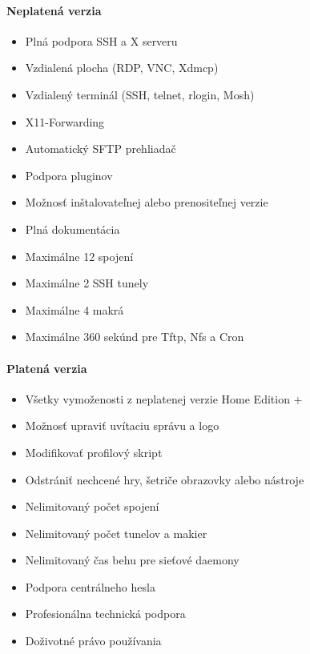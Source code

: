 \paragraph{Neplatená verzia}
\begin{itemize}
	\item Plná podpora SSH a X serveru
	\item Vzdialená plocha (RDP, VNC, Xdmcp)
	\item Vzdialený terminál (SSH, telnet, rlogin, Mosh)
	\item X11-Forwarding
	\item Automatický SFTP prehliadač
	\item Podpora pluginov
	\item Možnosť inštalovateľnej alebo prenositeľnej verzie
	\item Plná dokumentácia
	\item Maximálne 12 spojení
	\item Maximálne 2 SSH tunely
	\item Maximálne 4 makrá
	\item Maximálne 360 sekúnd pre Tftp, Nfs a Cron
\end{itemize}

\paragraph{Platená verzia}

\begin{itemize}
	\item Všetky vymoženosti z neplatenej verzie Home Edition +
	\item Možnosť upraviť uvítaciu správu a logo
	\item Modifikovať profilový skript
	\item Odstrániť nechcené hry, šetriče obrazovky alebo nástroje
	\item Nelimitovaný počet spojení
	\item Nelimitovaný počet tunelov a makier
	\item Nelimitovaný čas behu pre sieťové daemony
	\item Podpora centrálneho hesla
	\item Profesionálna technická podpora
	\item Doživotné právo používania
\end{itemize}

